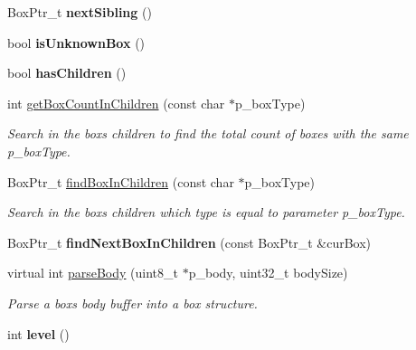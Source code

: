 \begin{DoxyCompactItemize}
Box\+Ptr\+\_\+t {\bfseries next\+Sibling} ()
\item 
\mbox{\label{classmp4_parser_1_1_box_a0fdfc1bfb891edb4a285c97cfe0b85c9}} 
bool {\bfseries is\+Unknown\+Box} ()
\item 
\mbox{\label{classmp4_parser_1_1_box_a1ef4e4c2dbacf1bb8e6c1f5a97f762e4}} 
bool {\bfseries has\+Children} ()
\item 
\mbox{\label{classmp4_parser_1_1_box_a2a60245c22cd810820fc43f38bf0821d}} 
int \mbox{\hyperlink{classmp4_parser_1_1_box_a2a60245c22cd810820fc43f38bf0821d}{get\+Box\+Count\+In\+Children}} (const char $\ast$p\+\_\+box\+Type)
\begin{DoxyCompactList}\small\item\em Search in the box\textquotesingle{}s children to find the total count of boxes with the same p\+\_\+box\+Type. \end{DoxyCompactList}\item 
Box\+Ptr\+\_\+t \mbox{\hyperlink{classmp4_parser_1_1_box_a1dc6d8d489a5099e167cdd7a1a592ea2}{find\+Box\+In\+Children}} (const char $\ast$p\+\_\+box\+Type)
\begin{DoxyCompactList}\small\item\em Search in the box\textquotesingle{}s children which type is equal to parameter p\+\_\+box\+Type. \end{DoxyCompactList}\item 
\mbox{\label{classmp4_parser_1_1_box_a96bab9fc4a86d5b544bcb9c37725f2fa}} 
Box\+Ptr\+\_\+t {\bfseries find\+Next\+Box\+In\+Children} (const Box\+Ptr\+\_\+t \&cur\+Box)
\item 
virtual int \mbox{\hyperlink{classmp4_parser_1_1_box_a3dd0c084ac65bc77b69ac5ecaf796cb2}{parse\+Body}} (uint8\+\_\+t $\ast$p\+\_\+body, uint32\+\_\+t body\+Size)
\begin{DoxyCompactList}\small\item\em Parse a box\textquotesingle{}s body buffer into a box structure. \end{DoxyCompactList}\item 
\mbox{\label{classmp4_parser_1_1_box_a1495392fdac2bb838ac0c03de82ea46a}} 
int {\bfseries level} ()
\item 

\end{DoxyCompactItemize}

